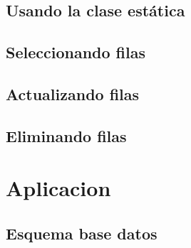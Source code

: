 \documentclass[12pt, oneside]{article}
\begin{document}
	\subsection{Usando la clase estática}
		

	\subsection{Seleccionando filas}
		

	\subsection{Actualizando filas} 
		

	\subsection{Eliminando filas}
		

\section{Aplicacion}
\subsection{Esquema base datos}

\end{document}
